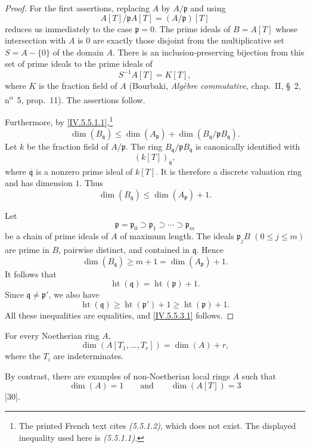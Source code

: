 \begin{proof}
For the first assertions, replacing $A$ by $A/\mathfrak p$ and using
\[
A[T]/\mathfrak pA[T]=(A/\mathfrak p)[T]
\]
reduces us immediately to the case $\mathfrak p=0$.
The prime ideals of $B=A[T]$ whose intersection with $A$ is $0$ are
exactly those disjoint from the multiplicative set
$S=A-\{0\}$ of the domain $A$.
There is an inclusion-preserving bijection from this set of prime
ideals to the prime ideals of
\[
S^{-1}A[T]=K[T],
\]
where $K$ is the fraction field of $A$
(Bourbaki, \emph{Alg\`ebre commutative}, chap.~II, \S~2,
n\textsuperscript{o}~5, prop.~11).
The assertions follow.

Furthermore, by \eqref{IV.5.5.1.1},\footnote{The printed French text
cites \emph{(5.5.1.2)}, which does not exist.  The displayed
inequality used here is \emph{(5.5.1.1)}.}
\[
\dim(B_{\mathfrak q})
 \leq\dim(A_{\mathfrak p})
   +\dim(B_{\mathfrak q}/\mathfrak pB_{\mathfrak q}).
\]
Let $k$ be the fraction field of $A/\mathfrak p$.
The ring $B_{\mathfrak q}/\mathfrak pB_{\mathfrak q}$ is canonically
identified with
\[
(k[T])_{\overline{\mathfrak q}},
\]
where $\overline{\mathfrak q}$ is a nonzero prime ideal of $k[T]$.
It is therefore a discrete valuation ring and has dimension $1$.
Thus
\[
\dim(B_{\mathfrak q})\leq\dim(A_{\mathfrak p})+1.
\]

Let
\[
\mathfrak p=\mathfrak p_0
 \supset\mathfrak p_1
 \supset\cdots
 \supset\mathfrak p_m
\]
be a chain of prime ideals of $A$ of maximum length.
The ideals $\mathfrak p_jB$ $(0\leq j\leq m)$ are prime in $B$,
pairwise distinct, and contained in $\mathfrak q$.
Hence
\[
\dim(B_{\mathfrak q})
 \geq m+1
 =\dim(A_{\mathfrak p})+1.
\]
It follows that
\[
\operatorname{ht}(\mathfrak q)
  =\operatorname{ht}(\mathfrak p)+1.
\]
Since $\mathfrak q\neq\mathfrak p'$, we also have
\[
\operatorname{ht}(\mathfrak q)
 \geq\operatorname{ht}(\mathfrak p')+1
 \geq\operatorname{ht}(\mathfrak p)+1.
\]
All these inequalities are equalities, and
\eqref{IV.5.5.3.1} follows.
\end{proof}

\begin{corollary}[5.5.4]
\label{IV.5.5.4}
For every Noetherian ring $A$,
\begin{equation}
\dim(A[T_1,\ldots,T_r])=\dim(A)+r,
\tag{5.5.4.1}\label{IV.5.5.4.1}
\end{equation}
where the $T_i$ are indeterminates.
\end{corollary}

By contrast, there are examples of non-Noetherian local rings $A$
such that
\[
\dim(A)=1
\qquad\text{and}\qquad
\dim(A[T])=3
\]
[30].

